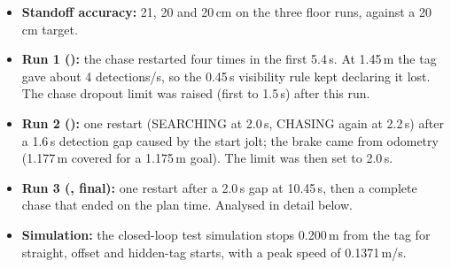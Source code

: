 \begin{itemize}
  \item \textbf{Standoff accuracy:} 21, 20 and 20\,cm on the three floor runs, against a 20\,cm target.
  \item \textbf{Run 1 ():} the chase restarted four times in the first 5.4\,s. At 1.45\,m the tag gave about 4
        detections/s, so the 0.45\,s visibility rule kept declaring it lost. The chase dropout limit was raised (first
        to 1.5\,s) after this run.
  \item \textbf{Run 2 ():} one restart (SEARCHING at 2.0\,s, CHASING again at 2.2\,s) after a 1.6\,s detection gap caused by the start jolt; the
        brake came from odometry (1.177\,m covered for a 1.175\,m goal). The limit was then set to 2.0\,s.
  \item \textbf{Run 3 (, final):} one restart after a 2.0\,s gap at 10.45\,s, then a complete chase that
        ended on the plan time. Analysed in detail below.
  \item \textbf{Simulation:} the closed-loop test simulation stops 0.200\,m from the tag for straight, offset
        and hidden-tag starts, with a peak speed of 0.1371\,m/s.
\end{itemize}

